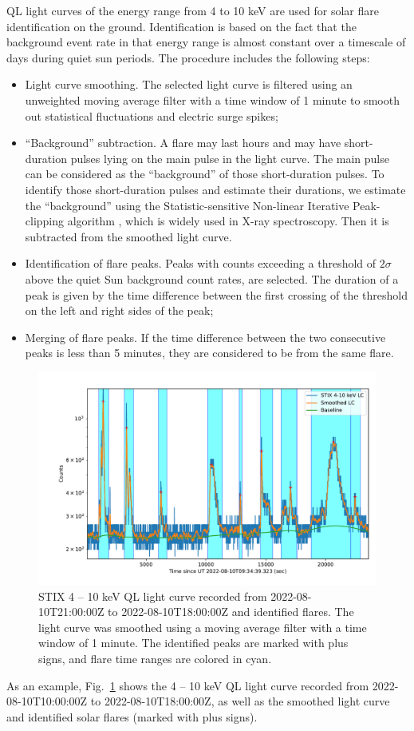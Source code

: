 \documentclass[referee]{aa} %
\begin{document}
QL light curves of the energy range from  4 to 10 keV are used for solar flare identification
on the ground. Identification is based on the fact 
that the background event rate in that energy range is almost constant 
over a timescale of days during quiet sun periods. 
The procedure includes the following steps:
\begin{itemize}
  \item Light curve smoothing. The selected light curve is filtered using an unweighted
  moving average filter with a time window of 1 minute to smooth out statistical fluctuations and electric surge spikes;
  \item “Background” subtraction.  
   A flare may last hours and may have short-duration pulses lying on the main pulse in the light curve.
   The main pulse can be considered as the “background” of those short-duration pulses.
  To identify those short-duration pulses and estimate their durations, 
  we estimate the “background”  using the Statistic-sensitive Non-linear Iterative Peak-clipping algorithm \cite{sinp}, which is widely used in X-ray spectroscopy.
    Then it is subtracted from the smoothed light curve.
  \item Identification of flare peaks. Peaks with counts exceeding a threshold of $2\sigma$ 
  above the quiet Sun background count rates,  
   are selected. The duration of a peak is given by the time difference between the first 
   crossing of the threshold on the left and right sides of the peak;  
  \item Merging of flare peaks. If the time difference between the two consecutive peaks is less than 5 minutes,
   they are considered to be from the same flare.
\end{itemize}

\begin{figure}
  \centering
  \includegraphics[width=0.8\linewidth]{figures/flaredet.pdf}
  \caption{STIX 4 -- 10 keV QL light curve recorded from 2022-08-10T21:00:00Z to 2022-08-10T18:00:00Z and 
  identified flares.   
  The light curve was smoothed using a moving average filter with a time window
  of 1 minute. 
  The identified peaks are marked with plus signs, and flare time ranges are colored in cyan.
  }
  \label{fig:flare-det}
\end{figure}
As an example, Fig.~\ref{fig:flare-det} shows  the 4 -- 10 keV QL  light curve recorded from 
2022-08-10T10:00:00Z to 2022-08-10T18:00:00Z,
 as well as the smoothed light curve and identified solar flares (marked with plus signs).
\end{document}
